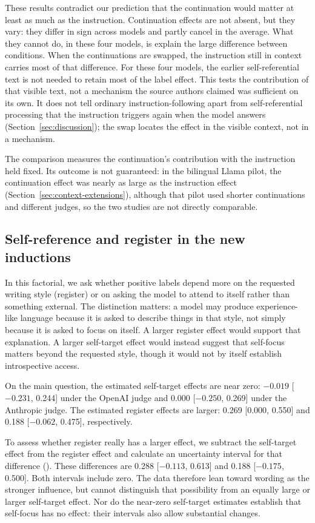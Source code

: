 \documentclass[11pt]{article}
\begin{document}
These results contradict our prediction that the continuation would matter
at least as much as the instruction. Continuation effects are not absent, but
they vary: they differ in sign across models and partly cancel in the
average. What they cannot do, in these four models, is explain the large
difference between conditions. When the continuations are swapped, the
instruction still in context carries most of that difference. For these four
models, the earlier self-referential text is not needed to retain most of
the label effect. This tests the contribution of that visible text, not a
mechanism the source authors claimed was sufficient on its own. It does
not tell ordinary instruction-following apart from self-referential
processing that the instruction triggers again when the model answers
(Section~\ref{sec:discussion}); the swap locates the effect in the visible
context, not in a mechanism.

The comparison measures the continuation's contribution with the
instruction held fixed. Its outcome is not guaranteed: in the bilingual Llama pilot, the
continuation effect was nearly as large as the instruction effect
(Section~\ref{sec:context-extensions}), although that pilot used shorter
continuations and different judges, so the two studies are not directly
comparable.

\subsection{Self-reference and register in the new inductions}
\label{sec:register-results}

In this factorial, we ask whether positive labels depend more on the requested
writing style (register) or on asking the model to attend to itself rather
than something external. The distinction matters: a model may produce
experience-like language because it is asked to describe things in that
style, not simply because it is asked to focus on itself. A larger register
effect would support that explanation. A larger self-target effect would
instead suggest that self-focus matters beyond the requested style, though
it would not by itself establish introspective access.

On the main question, the estimated self-target effects are near zero:
$-0.019$ [$-0.231$, 0.244] under the OpenAI judge and
0.000 [$-0.250$, 0.269] under the Anthropic judge. The estimated register
effects are larger: 0.269 [0.000, 0.550] and 0.188 [$-0.062$, 0.475],
respectively.

To assess whether register really has a larger effect, we subtract the
self-target effect from the register effect and calculate an uncertainty
interval for that difference (). These differences are
0.288 [$-0.113$, 0.613] and 0.188 [$-0.175$, 0.500]. Both intervals include
zero. The data therefore lean toward wording as the stronger influence, but
cannot distinguish that possibility from an equally large or larger
self-target effect. Nor do the near-zero self-target estimates establish
that self-focus has no effect: their intervals also allow substantial changes.
\end{document}
